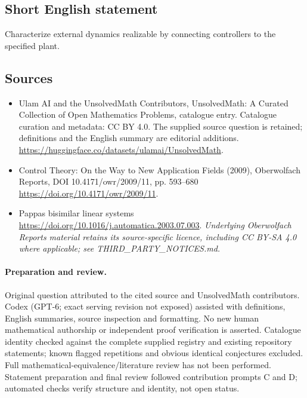 \documentclass[11pt]{article}
\begin{document}
\subsection{Short English statement}
Characterize external dynamics realizable by connecting controllers to the specified plant.
\subsection{Sources}
\begin{itemize}
\item[\hypertarget{source:statement:1}{S1}] Ulam AI and the UnsolvedMath Contributors, UnsolvedMath: A Curated Collection of Open Mathematics Problems, catalogue entry. Catalogue curation and metadata: CC BY 4.0. The supplied source question is retained; definitions and the English summary are editorial additions.
\url{https://huggingface.co/datasets/ulamai/UnsolvedMath}.
\item[\hypertarget{source:statement:2}{S2}] Control Theory: On the Way to New Application Fields (2009), Oberwolfach Reports, DOI 10.4171/owr/2009/11, pp. 593--680
\url{https://doi.org/10.4171/owr/2009/11}.
\item[\hypertarget{source:statement:3}{S3}] Pappas bisimilar linear systems
\url{https://doi.org/10.1016/j.automatica.2003.07.003}.
\textit{Underlying Oberwolfach Reports material retains its source-specific licence, including CC BY-SA 4.0 where applicable; see THIRD\_PARTY\_NOTICES.md.}
\end{itemize}
\paragraph{Preparation and review.}
Original question attributed to the cited source and UnsolvedMath contributors. Codex (GPT-6; exact serving revision not exposed) assisted with definitions, English summaries, source inspection and formatting. No new human mathematical authorship or independent proof verification is asserted. Catalogue identity checked against the complete supplied registry and existing repository statements; known flagged repetitions and obvious identical conjectures excluded. Full mathematical-equivalence/literature review has not been performed. Statement preparation and final review followed contribution prompts C and D; automated checks verify structure and identity, not open status.
\label{end:statement}
\end{document}
